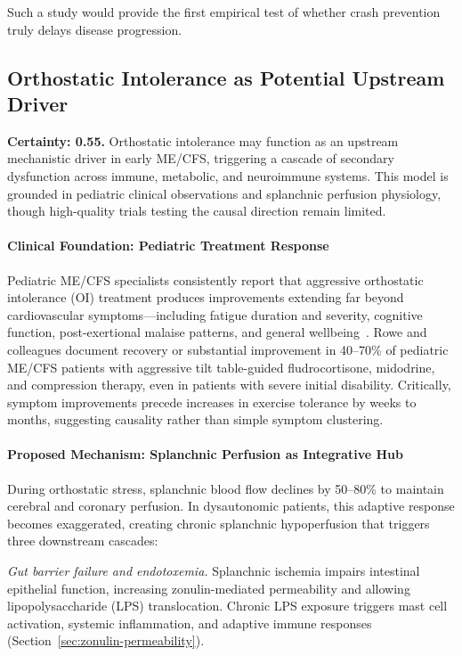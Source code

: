 Such a study would provide the first empirical test of whether crash prevention truly delays disease progression.

\subsection{Orthostatic Intolerance as Potential Upstream Driver}
\label{subsec:oi-lynchpin}

\begin{keypoint}
\label{key:oi-lynchpin}

\textbf{Certainty: 0.55.} Orthostatic intolerance may function as an upstream mechanistic driver in early ME/CFS, triggering a cascade of secondary dysfunction across immune, metabolic, and neuroimmune systems. This model is grounded in pediatric clinical observations and splanchnic perfusion physiology, though high-quality trials testing the causal direction remain limited.

\paragraph{Clinical Foundation: Pediatric Treatment Response}
Pediatric ME/CFS specialists consistently report that aggressive orthostatic intolerance (OI) treatment produces improvements extending far beyond cardiovascular symptoms---including fatigue duration and severity, cognitive function, post-exertional malaise patterns, and general wellbeing~\cite{Rowe2017pediatric}. Rowe and colleagues document recovery or substantial improvement in 40--70\% of pediatric ME/CFS patients with aggressive tilt table-guided fludrocortisone, midodrine, and compression therapy, even in patients with severe initial disability. Critically, symptom improvements precede increases in exercise tolerance by weeks to months, suggesting causality rather than simple symptom clustering.

\paragraph{Proposed Mechanism: Splanchnic Perfusion as Integrative Hub}
During orthostatic stress, splanchnic blood flow declines by 50--80\% to maintain cerebral and coronary perfusion. In dysautonomic patients, this adaptive response becomes exaggerated, creating chronic splanchnic hypoperfusion that triggers three downstream cascades:

\textit{Gut barrier failure and endotoxemia.} Splanchnic ischemia impairs intestinal epithelial function, increasing zonulin-mediated permeability and allowing lipopolysaccharide (LPS) translocation. Chronic LPS exposure triggers mast cell activation, systemic inflammation, and adaptive immune responses (Section~\ref{sec:zonulin-permeability}).


\end{keypoint}
